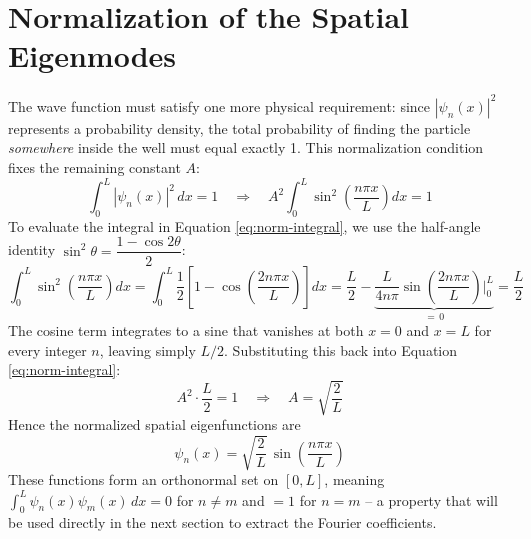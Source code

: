 \documentclass[12pt, a4paper]{article}
\begin{document}
\section{Normalization of the Spatial Eigenmodes}
The wave function must satisfy one more physical requirement: since
$|\psi_n(x)|^2$ represents a probability density, the total
probability of finding the particle \emph{somewhere} inside the well
must equal exactly 1. This normalization condition fixes the
remaining constant $A$:
\begin{equation}
    \int_0^L |\psi_n(x)|^2\, dx = 1
    \quad \Longrightarrow \quad
    A^2 \int_0^L \sin^2\!\left(\frac{n\pi x}{L}\right) dx = 1
    \label{eq:norm-integral}
\end{equation}
To evaluate the integral in Equation \eqref{eq:norm-integral}, we use
the half-angle identity $\sin^2\theta = \dfrac{1-\cos 2\theta}{2}$:
\begin{equation}
    \int_0^L \sin^2\!\left(\frac{n\pi x}{L}\right) dx
    = \int_0^L \frac{1}{2}\left[1 - \cos\!\left(\frac{2n\pi x}{L}\right)\right] dx
    = \frac{L}{2} - \underbrace{\frac{L}{4n\pi}\sin\!\left(\frac{2n\pi x}{L}\right)\Big|_0^L}_{=\,0}
    = \frac{L}{2}
\end{equation}
The cosine term integrates to a sine that vanishes at both $x=0$ and
$x=L$ for every integer $n$, leaving simply $L/2$. Substituting this
back into Equation \eqref{eq:norm-integral}:
\begin{equation}
    A^2 \cdot \frac{L}{2} = 1
    \quad \Longrightarrow \quad
    A = \sqrt{\frac{2}{L}}
\end{equation}
Hence the normalized spatial eigenfunctions are
\begin{equation}
    \psi_n(x) = \sqrt{\frac{2}{L}}\, \sin\!\left(\frac{n\pi x}{L}\right)
    \label{eq:psin}
\end{equation}
These functions form an orthonormal set on $[0,L]$, meaning
$\int_0^L \psi_n(x)\psi_m(x)\,dx = 0$ for $n \neq m$ and $=1$ for
$n=m$ -- a property that will be used directly in the next section to
extract the Fourier coefficients.
\end{document}
